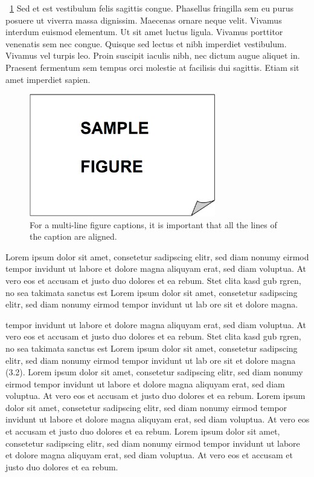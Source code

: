 \figurename\ \ref{fig:ch3-2} Sed et est vestibulum felis sagittis congue. Phasellus fringilla sem eu purus posuere ut viverra massa dignissim. Maecenas ornare neque velit. Vivamus interdum  euismod elementum. Ut sit amet luctus ligula. Vivamus porttitor venenatis sem nec  congue. Quisque sed lectus et nibh imperdiet vestibulum. Vivamus vel turpis leo.  Proin suscipit iaculis nibh, nec dictum augue aliquet in. Praesent fermentum sem  tempus orci molestie at facilisis dui sagittis. Etiam sit amet imperdiet sapien.

\vspace{6pt} %
\begin{figure}[!ht]
      \centering
      \includegraphics[width=230pt,keepaspectratio=true]{./fig/sekil3}
      \vspace{4mm}
      \caption{For a multi-line figure captions, it is important that all the
      lines of the caption are aligned.}
      \label{fig:ch3-2}
\end{figure}
\vspace{-9pt} %

Lorem ipsum dolor sit amet, consetetur sadipscing elitr, sed diam nonumy eirmod tempor invidunt ut labore et dolore magna aliquyam erat, sed diam voluptua. At vero eos et accusam et justo duo dolores et ea rebum. Stet clita kasd gub rgren, no sea takimata sanctus est Lorem ipsum dolor sit amet, consetetur sadipscing elitr, sed diam nonumy eirmod tempor invidunt ut lab ore sit et dolore magna.

tempor invidunt ut labore et dolore magna aliquyam erat, sed diam voluptua. At vero eos et accusam et justo duo dolores et ea rebum. Stet clita kasd gub rgren, no sea takimata sanctus est Lorem ipsum dolor sit amet, consetetur sadipscing elitr, sed diam nonumy eirmod tempor invidunt ut lab ore sit et dolore magna (3.2). Lorem ipsum dolor sit amet, consetetur sadipscing elitr, sed diam nonumy eirmod tempor invidunt ut labore et dolore magna aliquyam erat, sed diam voluptua. At vero eos et accusam et justo duo dolores et ea rebum. Lorem ipsum dolor sit amet, consetetur sadipscing elitr, sed diam nonumy eirmod tempor invidunt ut labore et dolore magna aliquyam erat, sed diam voluptua. At vero eos et accusam et justo duo dolores et ea rebum. Lorem ipsum dolor sit amet, consetetur sadipscing elitr, sed diam nonumy eirmod tempor invidunt ut labore et dolore magna aliquyam erat, sed diam voluptua. At vero eos et accusam et justo duo dolores et ea rebum.

